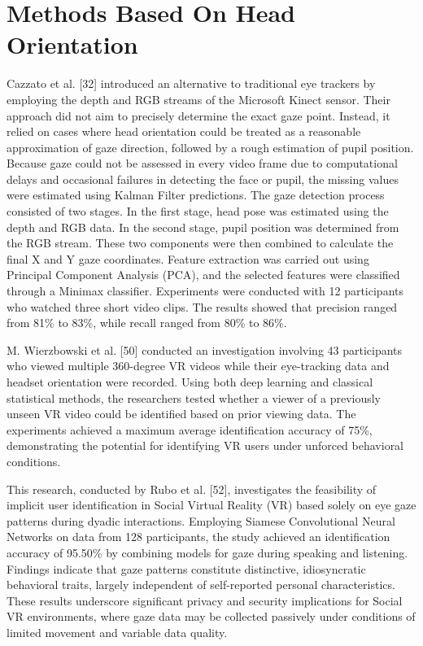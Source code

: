 \documentclass[12pt]{report}
\begin{document}
\section{Methods Based On Head Orientation}

Cazzato et al. [32] introduced an alternative to traditional eye trackers by employing the depth and RGB streams of the Microsoft Kinect sensor.
Their approach did not aim to precisely determine the exact gaze point.
Instead, it relied on cases where head orientation could be treated as a reasonable approximation of gaze direction, followed by a rough estimation of pupil position.
Because gaze could not be assessed in every video frame due to computational delays and occasional failures in detecting the face or pupil, the missing values were estimated using Kalman Filter predictions. 
The gaze detection process consisted of two stages. In the first stage, head pose was estimated using the depth and RGB data. 
In the second stage, pupil position was determined from the RGB stream. 
These two components were then combined to calculate the final X and Y gaze coordinates. 
Feature extraction was carried out using Principal Component Analysis (PCA), and the selected features were classified through a Minimax classifier.
Experiments were conducted with 12 participants who watched three short video clips. 
The results showed that precision ranged from 81\% to 83\%, while recall ranged from 80\% to 86\%.

M. Wierzbowski et al. [50] conducted an investigation involving 43 participants who viewed multiple 360-degree VR videos while their eye-tracking data and headset orientation were recorded.
Using both deep learning and classical statistical methods, the researchers tested whether a viewer of a previously unseen VR video could be identified based on prior viewing data. 
The experiments achieved a maximum average identification accuracy of 75\%, demonstrating the potential for identifying VR users under unforced behavioral conditions.

This research, conducted by Rubo et al. [52], investigates the feasibility of implicit user identification in Social Virtual Reality (VR) based solely on eye gaze patterns during dyadic interactions.
Employing Siamese Convolutional Neural Networks on data from 128 participants, the study achieved an identification accuracy of 95.50\% by combining models for gaze during speaking and listening. 
Findings indicate that gaze patterns constitute distinctive, idiosyncratic behavioral traits, largely independent of self-reported personal characteristics.
These results underscore significant privacy and security implications for Social VR environments, where gaze data may be collected passively under conditions of limited movement and variable data quality.
\end{document}
